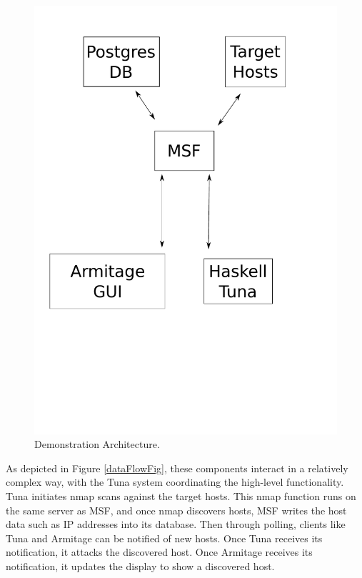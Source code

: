 \documentclass[figure,letterpaper,onefignum]{mysiam}
\begin{document}
\begin{figure}[h!]
  \caption{Demonstration Architecture.}
  \label{archFig}
  \centering
    \includegraphics[scale=0.3]{components.pdf}
\end{figure}


As depicted in Figure \ref{dataFlowFig}, these components interact in a relatively complex way, with the Tuna system coordinating the high-level functionality. Tuna initiates nmap scans against the target hosts. This nmap function runs on the same server as MSF, and once nmap discovers hosts, MSF writes the host data such as IP addresses into its database. Then through polling, clients like Tuna and Armitage can be notified of new hosts. Once Tuna receives its notification, it attacks the discovered host. Once Armitage receives its notification, it updates the display to show a discovered host.
\end{document}
